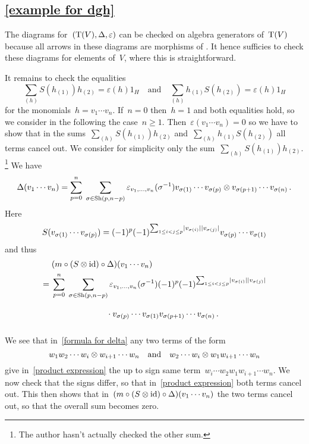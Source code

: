 \subsection{\cref{example for dgh}}
\label{example for dgh proof}

The {\dgc} diagrams for~$(\operatorname{T}(V), \Delta, \varepsilon)$ can be checked on algebra generators of~$\operatorname{T}(V)$ because all arrows in these diagrams are morphisms of {\dgas}.
It hence sufficies to check these diagrams for elements of~$V$, where this is straightforward.

It remains to check the equalities
\[
  \sum_{(h)} S(h_{(1)}) h_{(2)}
  =
  \varepsilon(h) 1_H
  \quad
  \text{and}\quad
  \sum_{(h)} h_{(1)} S(h_{(2)})
  =
  \varepsilon(h) 1_H
\]
for the monomials~$h = v_1 \dotsm v_n$.
If~$n = 0$ then~$h = 1$ and both equalities hold, so we consider in the following the case~$n \geq 1$.
Then~$\varepsilon(v_1 \dotsm v_n) = 0$ so we have to show that in the sums~$\sum_{(h)} S(h_{(1)}) h_{(2)}$ and~$\sum_{(h)} h_{(1)} S(h_{(2)})$ all terms cancel out.
We consider for simplicity only the sum~$\sum_{(h)} S(h_{(1)}) h_{(2)}$.%
\footnote{The author hasn’t actually checked the other sum.}
We have
\begin{equation}
  \label{formula for delta}
  \Delta(v_1 \dotsm v_n)
  =
  \sum_{p=0}^n
  \;
  \sum_{\sigma \in \operatorname{Sh}(p,n-p)}
  \varepsilon_{v_1, \dotsc, v_n}(\sigma^{-1})
  v_{\sigma(1)} \dotsm v_{\sigma(p)} \otimes v_{\sigma(p+1)} \dotsm v_{\sigma(n)} \,.
\end{equation}
Here
\[
  S(v_{\sigma(1)} \dotsm v_{\sigma(p)})
  =
  (-1)^p
  (-1)^{\sum_{1 \leq i < j \leq p} \lvert v_{\sigma(i)}\rvert \lvert v_{\sigma(j)}\rvert}
  v_{\sigma(p)} \dotsm v_{\sigma(1)}
\]
and thus
\begin{align}
  {}&
  (m \circ (S \tensor {\id}) \circ \Delta)(v_1 \dotsm v_n)
  \notag
\\
  ={}&
  \sum_{p=0}^n
  \;
  \sum_{\sigma \in \Sh(p,n-p)}
  \varepsilon_{v_1, \dotsc, v_n}(\sigma^{-1})
  (-1)^p
  (-1)^{\sum_{1 \leq i < j \leq p} \hdeg{v_{\sigma(i)}} \hdeg{v_{\sigma(j)}}}
  \notag
\\
  {}&
  \phantom{\sum_{p=0}^n \; \sum_{\sigma \in \Sh(p,n-p)}}
  \cdot v_{\sigma(p)} \dotsm v_{\sigma(1)} v_{\sigma(p+1)} \dotsm v_{\sigma(n)} \,.
  \label{product expression}
\end{align}
We see that in~\eqref{formula for delta} any two terms of the form
\[
  w_1 w_2 \dotsm w_i \otimes w_{i+1} \dotsm w_n
  \quad\text{and}\quad
  w_2 \dotsm w_i \otimes w_1 w_{i+1} \dotsm w_n
\]
give in~\eqref{product expression} the up to sign same term~$w_i \dotsm w_2 w_1 w_{i+1} \dotsm w_n$.
We now check that the signs differ, so that in~\eqref{product expression} both terms cancel out.
This then shows that in~$(m \circ (S \otimes {\operatorname{id}}) \circ \Delta)(v_1 \dotsm v_n)$ the two terms cancel out, so that the overall sum becomes zero.

